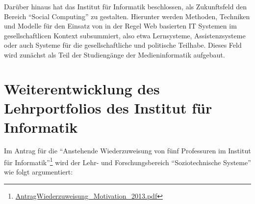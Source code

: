 Darüber hinaus hat das Institut für Informatik beschlossen, als
Zukunftsfeld den Bereich ``Social Computing'' zu gestalten. Hierunter
werden Methoden, Techniken und Modelle für den Einsatz von in der Regel
Web basierten IT Systemen im gesellschaftlicen Kontext subsummiert, also
etwa Lernsysteme, Assistenzsysteme oder auch Systeme für die
gesellschaftliche und politische Teilhabe. Dieses Feld wird zunächst als
Teil der Studiengänge der Medieninformatik aufgebaut.

\section{Weiterentwicklung des Lehrportfolios des Institut für
Informatik}\label{weiterentwicklung-des-lehrportfolios-des-institut-fuxfcr-informatik}

Im Antrag für die ``Anstehende Wiederzuweisung von fünf Professuren im
Institut für Informatik''\footnote{\href{../anhaenge/AntragWiederzuweisung_Motivation_2013.pdf}{AntragWiederzuweisung\_Motivation\_2013.pdf}}
wird der Lehr- und Forschungsbereich ``Soziotechnische Systeme'' wie
folgt argumentiert:

